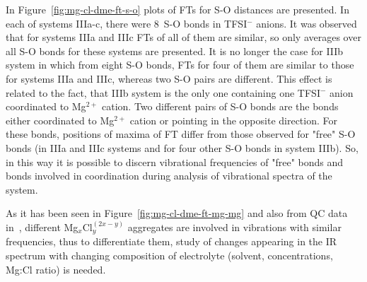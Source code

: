 In Figure~\ref{fig:mg-cl-dme-ft-s-o} plots of FTs for S-O distances are presented. In each of systems IIIa-c, there were 8~S-O bonds in TFSI$^{-}$ anions. It was observed that for systems IIIa and IIIc FTs of all of them are similar, so only averages over all S-O bonds for these systems are presented. It is no longer the case for IIIb system in which from eight S-O bonds, FTs for four of them are similar to those for systems IIIa and IIIc, whereas two S-O pairs are different. This effect is related to the fact, that IIIb system is the only one containing one TFSI$^{-}$ anion coordinated to Mg$^{2+}$ cation. Two different pairs of S-O bonds are the bonds either coordinated to Mg$^{2+}$ cation or pointing in the opposite direction. For these bonds, positions of maxima of FT differ from those observed for "free" S-O bonds (in IIIa and IIIc systems and for four other S-O bonds in system IIIb). So, in this way it is possible to discern vibrational frequencies of "free" bonds and bonds involved in coordination during analysis of vibrational spectra of the system.

As it has been seen in Figure~\ref{fig:mg-cl-dme-ft-mg-mg} and also from QC data in~\cite{mg-cl-dme}, different Mg$_x$Cl$_y^{(2x - y)}$ aggregates are involved in vibrations with similar frequencies, thus to differentiate them, study of changes appearing in the IR spectrum with changing composition of electrolyte (solvent, concentrations, Mg:Cl ratio) is needed.

\cleardoublepage